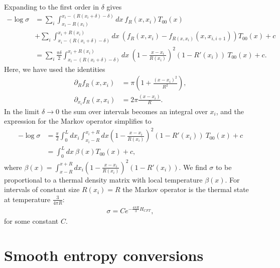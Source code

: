 \documentclass[12pt]{article}
\newcommand{\rb}{\right)}
\newcommand{\lb}{\left(}
\def\bea{\begin{eqnarray}}
\def\eea{\end{eqnarray}}
\newcommand{\nn}{\nonumber}
\begin{document}
Expanding to the first order in $\delta$ gives
\begin{align}
-\log\sigma&=\sum_i\int_{x_i-R(x_i)}^{x_i-(R(x_i+\delta)-\delta)} dx\:f_R(x,x_i)T_{00}(x)\nn\\
&+\sum_i\int_{x_i-(R(x_i+\delta)-\delta)}^{x_i+R(x_i)}dx\:\lb f_R(x,x_i)-f_{R(x,x_i)}(x,x_{i,i+1})\rb T_{00}(x)+c\nn\\
&=\sum_i\frac{\pi\delta}{2}\int_{x_i-(R(x_i+\delta)-\delta)}^{x_i+R(x_i)} dx\:\lb1-\frac{x-x_i}{R(x_i)}\rb^2(1-R'(x_i))\: T_{00}(x)+c.
\end{align}
Here, we have used the identities
\begin{align}
\partial_Rf_R(x,x_i)& =\pi\lb 1+\frac{(x-x_i)^2}{R^2}\rb,\nn\\
\partial_{x_i}f_R(x,x_i)&=2\pi\frac{(x-x_i)}{R}.
\end{align}
In the limit $\delta\to 0$ the sum over intervals becomes an integral over $x_i$, and the expression for the Markov operator simplifies to
\begin{align}
-\log\sigma&=\frac{\pi}{2}\int_{0}^{L}dx_i\int_{x_i-R}^{x_i+R}dx\lb 1-\frac{x-x_i}{R(x_i)}\rb^2(1-R'(x_i))\: T_{00}(x)+c\nn\\
&=\int_0^L dx\: \beta(x)T_{00}(x)+c,
\end{align}
where $\beta(x)=\int_{x-R}^{x+R}dx_i\lb 1-\frac{x-x_i}{R(x_i)}\rb^2(1-R'(x_i))$.
We find $\sigma$ to be proportional to a thermal density matrix with local temperature $\beta(x)$. For intervals of constant size $R(x_i)=R$  the Markov operator is the thermal state at temperature $\frac{3}{4\pi R}$:
\bea
\sigma= C e^{-\frac{4\pi R}{3} H_{CFT}},
\eea
for some constant $C$.


\section{Smooth entropy conversions} \label{smooth-ent-ineq}
\end{document}
